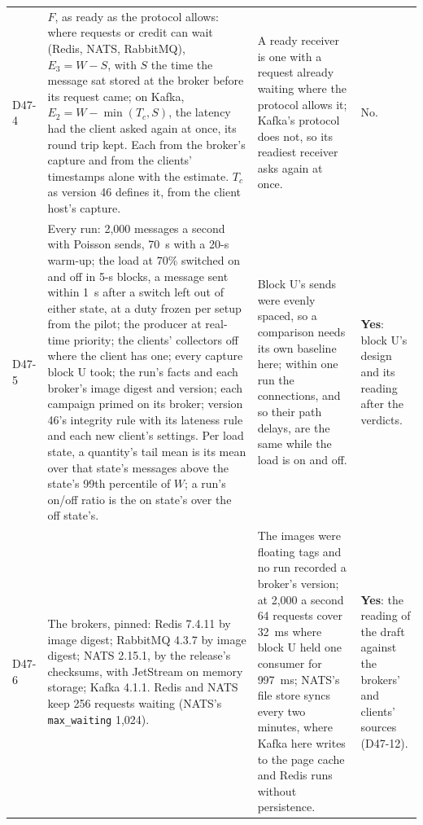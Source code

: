 \documentclass[11pt]{article}
\begin{document}
{\begin{longtable}{@{}p{1.1cm} >{\raggedright\arraybackslash}p{6.1cm} >{\raggedright\arraybackslash}p{6.0cm} >{\raggedright\arraybackslash}p{2.2cm}@{}}
D47-4 & $F$, as ready as the protocol allows: where requests or credit can wait (Redis, NATS, RabbitMQ), $E_3 = W - S$, with $S$ the time the message sat stored at the broker before its request came; on Kafka, $E_2 = W - \min(T_c, S)$, the latency had the client asked again at once, its round trip kept. Each from the broker's capture and from the clients' timestamps alone with the estimate. $T_c$ as version 46 defines it, from the client host's capture. & A ready receiver is one with a request already waiting where the protocol allows it; Kafka's protocol does not, so its readiest receiver asks again at once. & No. \\
D47-5 & Every run: 2,000 messages a second with Poisson sends, 70~s with a 20-s warm-up; the load at 70\% switched on and off in 5-s blocks, a message sent within 1~s after a switch left out of either state, at a duty frozen per setup from the pilot; the producer at real-time priority; the clients' collectors off where the client has one; every capture block U took; the run's facts and each broker's image digest and version; each campaign primed on its broker; version 46's integrity rule with its lateness rule and each new client's settings. Per load state, a quantity's tail mean is its mean over that state's messages above the state's 99th percentile of $W$; a run's on/off ratio is the on state's over the off state's. & Block U's sends were evenly spaced, so a comparison needs its own baseline here; within one run the connections, and so their path delays, are the same while the load is on and off. & \textbf{Yes}: block U's design and its reading after the verdicts. \\
D47-6 & The brokers, pinned: Redis 7.4.11 by image digest; RabbitMQ 4.3.7 by image digest; NATS 2.15.1, by the release's checksums, with JetStream on memory storage; Kafka 4.1.1. Redis and NATS keep 256 requests waiting (NATS's \texttt{max\_waiting} 1,024). & The images were floating tags and no run recorded a broker's version; at 2,000 a second 64 requests cover 32~ms where block U held one consumer for 997~ms; NATS's file store syncs every two minutes, where Kafka here writes to the page cache and Redis runs without persistence. & \textbf{Yes}: the reading of the draft against the brokers' and clients' sources (D47-12). \\

\end{longtable}}
\end{document}
